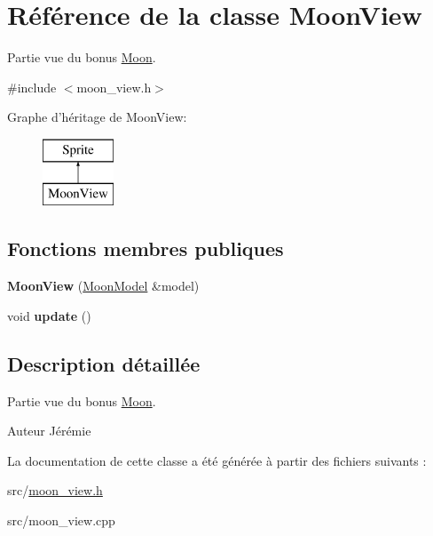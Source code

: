 \hypertarget{class_moon_view}{\section{Référence de la classe Moon\+View}
\label{class_moon_view}
}


Partie vue du bonus \hyperlink{class_moon}{Moon}.  




{\ttfamily \#include $<$moon\+\_\+view.\+h$>$}

Graphe d'héritage de Moon\+View\+:\begin{figure}[H]
\begin{center}
\leavevmode
\includegraphics[height=2.000000cm]{class_moon_view}
\end{center}
\end{figure}
\subsection*{Fonctions membres publiques}
\begin{DoxyCompactItemize}
\item 
\hypertarget{class_moon_view_a6e489951949c5d1dfcb990d643b35a32}{{\bfseries Moon\+View} (\hyperlink{class_moon_model}{Moon\+Model} \&model)}\label{class_moon_view_a6e489951949c5d1dfcb990d643b35a32}

\item 
\hypertarget{class_moon_view_a49115f389787ce68cefab8835a35ae3a}{void {\bfseries update} ()}\label{class_moon_view_a49115f389787ce68cefab8835a35ae3a}

\end{DoxyCompactItemize}


\subsection{Description détaillée}
Partie vue du bonus \hyperlink{class_moon}{Moon}. 

\begin{DoxyAuthor}{Auteur}
Jérémie 
\end{DoxyAuthor}


La documentation de cette classe a été générée à partir des fichiers suivants \+:\begin{DoxyCompactItemize}
\item 
src/\hyperlink{moon__view_8h}{moon\+\_\+view.\+h}\item 
src/moon\+\_\+view.\+cpp\end{DoxyCompactItemize}
